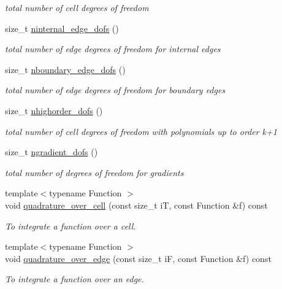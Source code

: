 \begin{DoxyCompactItemize}
\begin{DoxyCompactList}\small\item\em total number of cell degrees of freedom \end{DoxyCompactList}\item 
size\+\_\+t \hyperlink{group__HybridCore_gae6e771ab58f248db8f051d47de982cf5}{ninternal\+\_\+edge\+\_\+dofs} ()
\begin{DoxyCompactList}\small\item\em total number of edge degrees of freedom for internal edges \end{DoxyCompactList}\item 
size\+\_\+t \hyperlink{group__HybridCore_ga5fd63afc45211d3005f6e25682c533b2}{nboundary\+\_\+edge\+\_\+dofs} ()
\begin{DoxyCompactList}\small\item\em total number of edge degrees of freedom for boundary edges \end{DoxyCompactList}\item 
size\+\_\+t \hyperlink{group__HybridCore_gaa7f78bc066429a18ad596d45a79d37bc}{nhighorder\+\_\+dofs} ()
\begin{DoxyCompactList}\small\item\em total number of cell degrees of freedom with polynomials up to order k+1 \end{DoxyCompactList}\item 
size\+\_\+t \hyperlink{group__HybridCore_ga6f7c5ef5103bed8a3e0ecc18d592b1f9}{ngradient\+\_\+dofs} ()
\begin{DoxyCompactList}\small\item\em total number of degrees of freedom for gradients \end{DoxyCompactList}\item 
{\footnotesize template$<$typename Function $>$ }\\void \hyperlink{group__HybridCore_ga3c33c8cec55dbe2d8873e53fcd43d01f}{quadrature\+\_\+over\+\_\+cell} (const size\+\_\+t iT, const Function \&f) const
\begin{DoxyCompactList}\small\item\em To integrate a function over a cell. \end{DoxyCompactList}\item 
{\footnotesize template$<$typename Function $>$ }\\void \hyperlink{group__HybridCore_gafbf9c61f2d929331197ba971b52b8710}{quadrature\+\_\+over\+\_\+edge} (const size\+\_\+t iF, const Function \&f) const
\begin{DoxyCompactList}\small\item\em To integrate a function over an edge. \end{DoxyCompactList}\item 

\end{DoxyCompactItemize}
